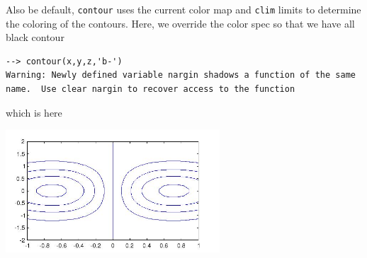 Also be default, \verb|contour| uses the current color map and \verb|clim|
limits to determine the coloring of the contours.  Here, we override the
color spec so that we have all black contour
\begin{verbatim}
--> contour(x,y,z,'b-')
Warning: Newly defined variable nargin shadows a function of the same name.  Use clear nargin to recover access to the function
\end{verbatim}
which is here


\centerline{\includegraphics[width=8cm]{contour4}}

